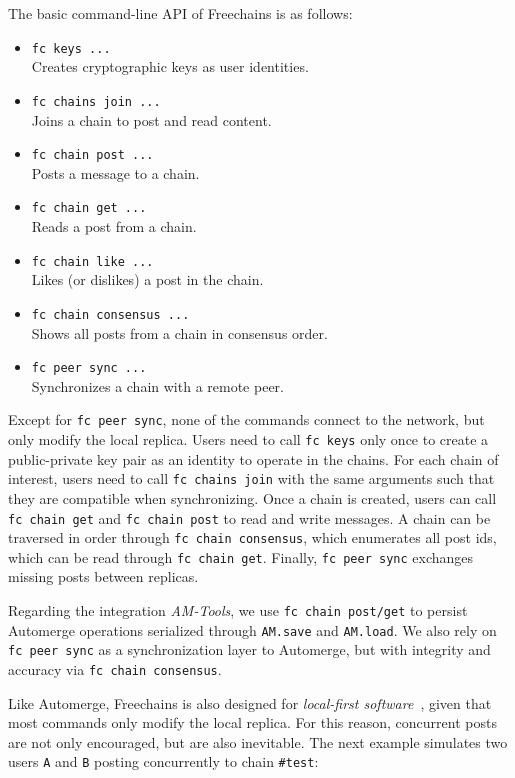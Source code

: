 \documentclass[12pt]{article}
\newcommand{\AMT}      {\emph{AM-Tools}\xspace}
\newcommand{\code}[1]  {\texttt{\footnotesize{#1}}}
\begin{document}
The basic command-line API of Freechains is as follows:

\begin{itemize}
\item \code{fc keys ...} \\
    Creates cryptographic keys as user identities.
\item \code{fc chains join ...} \\
    Joins a chain to post and read content.
\item \code{fc chain post ...} \\
    Posts a message to a chain.
\item \code{fc chain get ...} \\
    Reads a post from a chain.
\item \code{fc chain like ...} \\
    Likes (or dislikes) a post in the chain.
\item \code{fc chain consensus ...} \\
    Shows all posts from a chain in consensus order.
\item \code{fc peer sync ...} \\
    Synchronizes a chain with a remote peer.
\end{itemize}

Except for \code{fc~peer~sync}, none of the commands connect to the network,
but only modify the local replica.
%
Users need to call \code{fc~keys} only once to create a public-private key pair
as an identity to operate in the chains.
%
For each chain of interest, users need to call \code{fc~chains~join} with the
same arguments such that they are compatible when synchronizing.
%
Once a chain is created, users can call \code{fc~chain~get} and
\code{fc~chain~post} to read and write messages.
%
A chain can be traversed in order through \code{fc~chain~consensus}, which
enumerates all post ids, which can be read through \code{fc~chain~get}.
%
Finally, \code{fc~peer~sync} exchanges missing posts between replicas.

Regarding the integration \AMT, we use \code{fc~chain~post/get} to persist
Automerge operations serialized through \code{AM.save} and \code{AM.load}.
We also rely on \code{fc~peer~sync} as a synchronization layer to Automerge,
but with integrity and accuracy via \code{fc~chain~consensus}.

Like Automerge, Freechains is also designed for
\emph{local-first software}~\cite{p2p.local}, given that most commands only
modify the local replica.
For this reason, concurrent posts are not only encouraged, but are also
inevitable.
The next example simulates two users \code{A} and \code{B} posting concurrently
to chain \code{\#test}:
\end{document}
